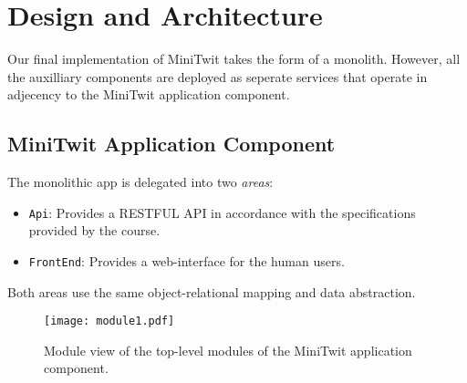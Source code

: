 \section{Design and Architecture}\label{sec:design-arch}

Our final implementation of MiniTwit takes the form of a monolith. %
However, all the auxilliary components are deployed as seperate services that operate in adjecency to the MiniTwit application component.

\subsection{MiniTwit Application Component}

The monolithic app is delegated into two \textit{areas}:%

\begin{itemize}
	\item \texttt{Api}: Provides a RESTFUL API in accordance with the specifications provided by the course. %
	\item \texttt{FrontEnd}: Provides a web-interface for the human users.%
\end{itemize}

Both areas use the same object-relational mapping and data abstraction.%

\begin{figure}
	\begin{center}
		\texttt{[image: module1.pdf]}
	\end{center}
	\caption{Module view of the top-level modules of the MiniTwit application component.}\label{fig:module1}
\end{figure}



